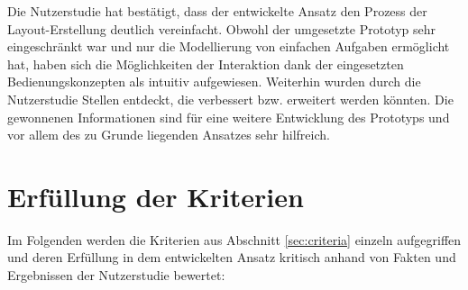 Die Nutzerstudie hat bestätigt, dass der entwickelte Ansatz den Prozess der Layout-Erstellung deutlich vereinfacht. Obwohl der umgesetzte Prototyp sehr eingeschränkt war und nur die Modellierung von einfachen Aufgaben ermöglicht hat, haben sich die Möglichkeiten der Interaktion dank der eingesetzten Bedienungskonzepten als intuitiv aufgewiesen. Weiterhin wurden durch die Nutzerstudie Stellen entdeckt, die verbessert bzw. erweitert werden könnten. Die gewonnenen Informationen sind für eine weitere Entwicklung des Prototyps und vor allem des zu Grunde liegenden Ansatzes sehr hilfreich.

\section{Erfüllung der Kriterien}
\label{sec:criteria-evaluation}

Im Folgenden werden die Kriterien aus Abschnitt \ref{sec:criteria} einzeln aufgegriffen und deren Erfüllung in dem entwickelten Ansatz kritisch anhand von Fakten und Ergebnissen der Nutzerstudie bewertet:


